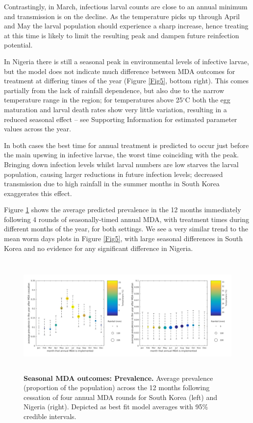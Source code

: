 Contrastingly, in March, infectious larval counts are close to an annual minimum and transmission is on the decline. As the temperature picks up through April and May the larval population should experience a sharp increase, hence treating at this time is likely to limit the resulting peak and dampen future reinfection potential. 

In Nigeria there is still a seasonal peak in environmental levels of infective larvae, but the model does not indicate much difference between MDA outcomes for treatment at differing times of the year (Figure \ref{Fig5}, bottom right). This comes partially from the lack of rainfall dependence, but also due to the narrow temperature range in the region; for temperatures above 25$^{\circ}$C both the egg maturation and larval death rates show very little variation, resulting in a reduced seasonal effect -- see Supporting Information for estimated parameter values across the year.

In both cases the best time for annual treatment is predicted to occur just before the main upswing in infective larvae, the worst time coinciding with the peak. Bringing down infection levels whilst larval numbers are low starves the larval population, causing larger reductions in future infection levels; decreased transmission due to high rainfall in the summer months in South Korea exaggerates this effect.

Figure \ref{Fig8} shows the average predicted prevalence in the 12 months immediately following 4 rounds of seasonally-timed annual MDA, with treatment times during different months of the year, for both settings. We see a very similar trend to the mean worm days plots in Figure \ref{Fig5}, with large seasonal differences in South Korea and no evidence for any significant difference in Nigeria.

\begin{figure}[h]
\includegraphics[height=6.0cm]{Project/Figures/STH/Fig8.pdf}
\caption{{\bf Seasonal MDA outcomes: Prevalence.}
Average prevalence (proportion of the population) across the 12 months following cessation of four annual MDA rounds for South Korea (left) and Nigeria (right). Depicted as best fit model averages with 95\% credible intervals.}
\label{Fig8}
\end{figure} 

